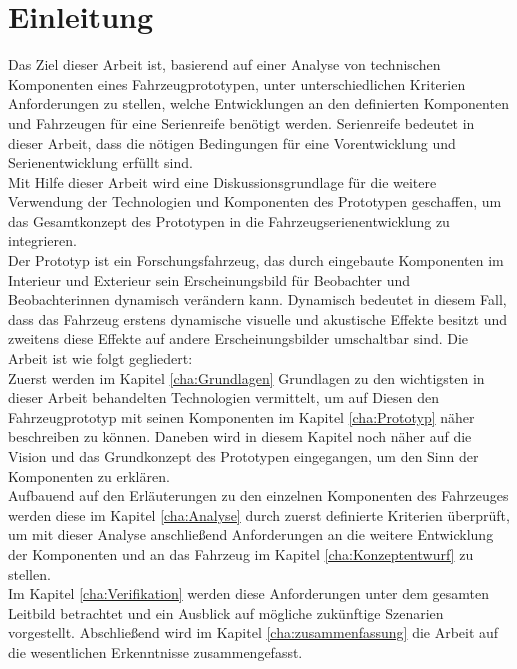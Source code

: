 \chapter{Einleitung}
\label{cha:Einleitung}
Das Ziel dieser Arbeit ist, basierend auf einer Analyse von technischen Komponenten eines Fahrzeugprototypen, unter unterschiedlichen Kriterien Anforderungen zu stellen, welche Entwicklungen an den definierten Komponenten und Fahrzeugen für eine Serienreife benötigt werden. Serienreife bedeutet in dieser Arbeit, dass die nötigen Bedingungen für eine Vorentwicklung und Serienentwicklung erfüllt sind.\\
Mit Hilfe dieser Arbeit wird eine Diskussionsgrundlage für die weitere Verwendung der Technologien und Komponenten des Prototypen geschaffen, um das Gesamtkonzept des Prototypen in die Fahrzeugserienentwicklung zu integrieren.\\
Der Prototyp ist ein Forschungsfahrzeug, das durch eingebaute Komponenten im Interieur und Exterieur sein Erscheinungsbild für Beobachter und Beobachterinnen dynamisch verändern kann. Dynamisch bedeutet in diesem Fall, dass das Fahrzeug erstens dynamische visuelle und akustische Effekte besitzt und zweitens diese Effekte auf andere Erscheinungsbilder umschaltbar sind.
Die Arbeit ist wie folgt gegliedert:\\
Zuerst werden im Kapitel \ref{cha:Grundlagen} Grundlagen zu den wichtigsten in dieser Arbeit behandelten Technologien vermittelt, um auf Diesen den Fahrzeugprototyp mit seinen Komponenten im Kapitel \ref{cha:Prototyp} näher beschreiben zu können. Daneben wird in diesem Kapitel noch näher auf die Vision und das Grundkonzept des Prototypen eingegangen, um den Sinn der Komponenten zu erklären.\\
Aufbauend auf den Erläuterungen zu den einzelnen Komponenten des Fahrzeuges werden diese im Kapitel \ref{cha:Analyse} durch zuerst definierte Kriterien überprüft, um mit dieser Analyse anschließend Anforderungen an die weitere Entwicklung der Komponenten und an das Fahrzeug im Kapitel \ref{cha:Konzeptentwurf} zu stellen.\\
Im Kapitel \ref{cha:Verifikation} werden diese Anforderungen unter dem gesamten Leitbild betrachtet und ein Ausblick auf mögliche zukünftige Szenarien vorgestellt. Abschließend wird im Kapitel \ref{cha:zusammenfassung} die Arbeit auf die wesentlichen Erkenntnisse zusammengefasst.